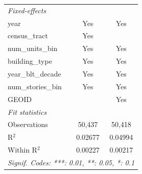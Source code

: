 \begin{tabular}{lcc}
   \midrule
   \emph{Fixed-effects}\\
   year                                                  & Yes             & Yes\\  
   census\_tract                                         & Yes             & \\  
   num\_units\_bin                                       & Yes             & Yes\\  
   building\_type                                        & Yes             & Yes\\  
   year\_blt\_decade                                     & Yes             & Yes\\  
   num\_stories\_bin                                     & Yes             & Yes\\  
   GEOID                                                 &                 & Yes\\  
   \midrule
   \emph{Fit statistics}\\
   Observations                                          & 50,437          & 50,418\\  
   R$^2$                                                 & 0.02677         & 0.04994\\  
   Within R$^2$                                          & 0.00227         & 0.00217\\  
   \midrule \midrule
   \multicolumn{3}{l}{\emph{Signif. Codes: ***: 0.01, **: 0.05, *: 0.1}}\\
\end{tabular}
\par\endgroup
\begingroup
\centering
